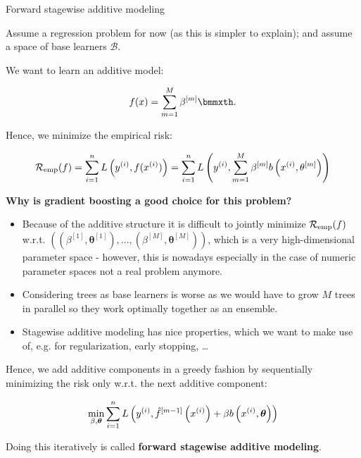 \begin{vbframe}{Forward stagewise additive modeling}

Assume a regression problem for now (as this is simpler to explain);
and assume a space of base learners $\mathcal{B}$.

\lz



We want to learn an additive model:

$$
\fx = \sum_{m=1}^M \betam \bmmxth.
$$

Hence, we minimize the empirical risk:

$$
\mathcal{R}_{\text{emp}}(f) = \sum_{i=1}^n L\left(y^{(i)},f(x^{(i)}) \right) =
\sum_{i=1}^n L\left(y^{(i)}, \sum_{m=1}^M \beta^{[m]} b\left(x^{(i)}, \theta^{[m]}\right)\right)
$$







\framebreak
\textbf{Why is gradient boosting a good choice for this problem?}
\begin{itemize}
\item Because of the additive structure it is difficult to jointly minimize $\mathcal{R}_{\text{emp}}(f)$ w.r.t. $\left(\left(\beta^{[1]}, \bm{\theta}^{[1]}\right), \ldots, \left(\beta^{[M]}, \bm{\theta}^{[M]}\right)\right)$, which is a very high-dimensional parameter space - however, this is nowadays especially in the case of numeric parameter spaces not a real problem anymore.
\item Considering trees as base learners is worse as we would have to grow $M$ trees in parallel so they
  work optimally together as an ensemble.
\item Stagewise additive modeling has nice properties, which we want to make use of, e.g. for regularization, early stopping, \dots
\end{itemize}

\framebreak

Hence, we add additive components in a greedy fashion by sequentially minimizing the risk only w.r.t. the next additive component:

$$ \min \limits_{\beta, \bm{\theta}} \sum_{i=1}^n L\left(y^{(i)}, \hat{f}^{[m-1]}\left(x^{(i)}\right) + \beta b\left(x^{(i)}, \bm{\theta}\right)\right) $$

\lz

Doing this iteratively is called \textbf{forward stagewise additive modeling}.



\end{vbframe}


